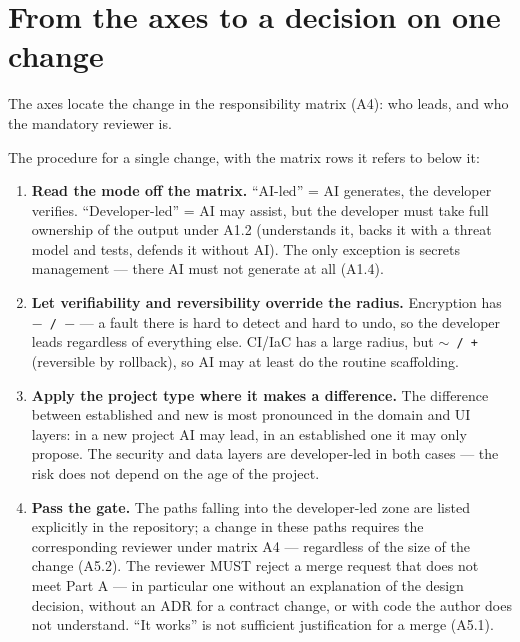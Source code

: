 \section*{From the axes to a decision on one change}

The axes locate the change in the responsibility matrix (A4): who leads, and who the mandatory reviewer is.

The procedure for a single change, with the matrix rows it refers to below it:

\begin{enumerate}
\item \textbf{Read the mode off the matrix.}
\enquote{AI-led} = AI generates, the developer verifies.
\enquote{Developer-led} = AI may assist, but the developer must take full ownership of the output under A1.2 (understands it, backs it with a threat model and tests, defends it without AI).
The only exception is secrets management --- there AI must not generate at all (A1.4).
\item \textbf{Let verifiability and reversibility override the radius.}
Encryption has \mbox{\texttt{$-$\,/\,$-$}} --- a fault there is hard to detect and hard to undo, so the developer leads regardless of everything else.
CI/IaC has a large radius, but \mbox{\texttt{$\sim$\,/\,+}} (reversible by rollback), so AI may at least do the routine scaffolding.
\item \textbf{Apply the project type where it makes a difference.}
The difference between established and new is most pronounced in the domain and UI layers: in a new project AI may lead, in an established one it may only propose.
The security and data layers are developer-led in both cases --- the risk does not depend on the age of the project.
\item \textbf{Pass the gate.}
The paths falling into the developer-led zone are listed explicitly in the repository; a change in these paths requires the corresponding reviewer under matrix A4 --- regardless of the size of the change (A5.2).
The reviewer MUST reject a merge request that does not meet Part A --- in particular one without an explanation of the design decision, without an ADR for a contract change, or with code the author does not understand.
\enquote{It works} is not sufficient justification for a merge (A5.1).
\end{enumerate}

